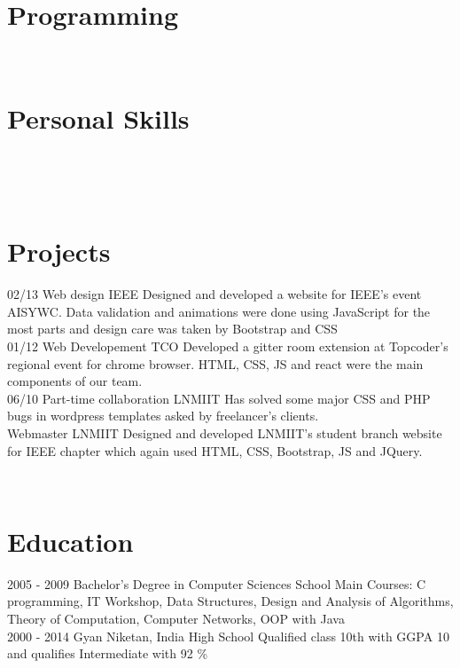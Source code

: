 \documentclass[]{friggeri-cv}
\begin{document}
\begin{aside}
  \section{Programming}
    ~
  \section{Personal Skills}
    ~
\end{aside}
~
\section{ Projects}
\begin{entrylist}
  \entry
    {02/13}
    {Web design}
    {IEEE}
    {Designed and developed a website for IEEE's event AISYWC. Data validation and animations were done using JavaScript for the most parts and design care was taken by Bootstrap and CSS \\}
  \entry
    {01/12}
    {Web Developement}
    {TCO}
    {Developed a gitter room extension at Topcoder's regional event for chrome browser. HTML, CSS, JS and react were the main components of our team. \\}
    \entry
    {06/10}
    {Part-time collaboration}
    {LNMIIT}
    {Has solved some major CSS and PHP bugs in wordpress templates asked by freelancer's clients. \\}
    \entry
    {}
    {Webmaster}
    {LNMIIT}
    {Designed and developed LNMIIT's student branch website for IEEE chapter which again used HTML, CSS, Bootstrap, JS and JQuery.}
\end{entrylist}
\\
\section{Education}
\begin{entrylist}
  \entry
    {2005 - 2009}
    {Bachelor's Degree in Computer Sciences}
    {School}
    {Main Courses: C programming, IT Workshop, Data Structures, Design and Analysis of Algorithms, Theory of Computation, Computer Networks, OOP with Java\\}
  \entry
    {2000 - 2014}
    {Gyan Niketan, India}
    {High School}
    {Qualified class 10th with GGPA 10 and qualifies Intermediate with 92 \%}
\end{entrylist}
\end{document}
